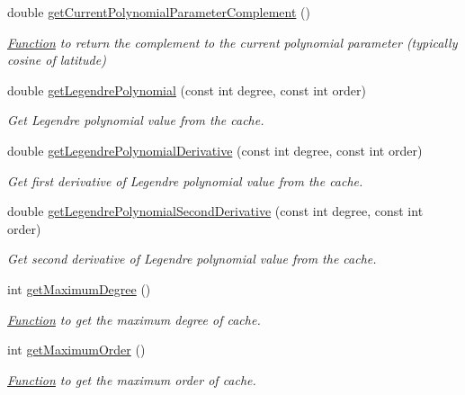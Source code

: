 \begin{DoxyCompactItemize}
double \hyperlink{classtudat_1_1basic__mathematics_1_1LegendreCache_a5a532a0f385e531180aa43604ad68ec5}{get\+Current\+Polynomial\+Parameter\+Complement} ()
\begin{DoxyCompactList}\small\item\em \hyperlink{classtudat_1_1basic__mathematics_1_1Function}{Function} to return the complement to the current polynomial parameter (typically cosine of latitude) \end{DoxyCompactList}\item 
double \hyperlink{classtudat_1_1basic__mathematics_1_1LegendreCache_a02a77fc013d30dc211432d4e52945971}{get\+Legendre\+Polynomial} (const int degree, const int order)
\begin{DoxyCompactList}\small\item\em Get Legendre polynomial value from the cache. \end{DoxyCompactList}\item 
double \hyperlink{classtudat_1_1basic__mathematics_1_1LegendreCache_af87bdafb61a50dad488f17aedf0cd4a3}{get\+Legendre\+Polynomial\+Derivative} (const int degree, const int order)
\begin{DoxyCompactList}\small\item\em Get first derivative of Legendre polynomial value from the cache. \end{DoxyCompactList}\item 
double \hyperlink{classtudat_1_1basic__mathematics_1_1LegendreCache_a75e0dca6ef4b5a740e9a28decac1d2d2}{get\+Legendre\+Polynomial\+Second\+Derivative} (const int degree, const int order)
\begin{DoxyCompactList}\small\item\em Get second derivative of Legendre polynomial value from the cache. \end{DoxyCompactList}\item 
int \hyperlink{classtudat_1_1basic__mathematics_1_1LegendreCache_ab1fb7963e60da2209408559c6ea3471f}{get\+Maximum\+Degree} ()
\begin{DoxyCompactList}\small\item\em \hyperlink{classtudat_1_1basic__mathematics_1_1Function}{Function} to get the maximum degree of cache. \end{DoxyCompactList}\item 
int \hyperlink{classtudat_1_1basic__mathematics_1_1LegendreCache_aa4504f508c9f1ff20f94ef4e31cf6433}{get\+Maximum\+Order} ()
\begin{DoxyCompactList}\small\item\em \hyperlink{classtudat_1_1basic__mathematics_1_1Function}{Function} to get the maximum order of cache. \end{DoxyCompactList}\item 

\end{DoxyCompactItemize}
